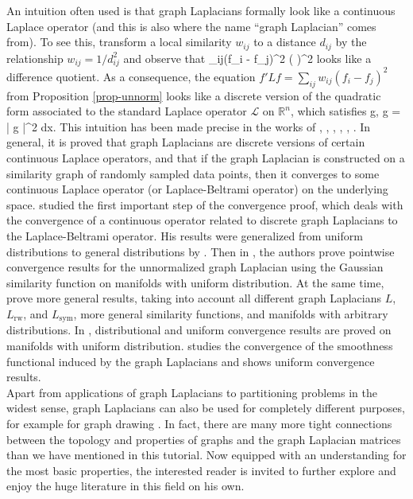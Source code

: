 \documentclass{article}
\def\ba#1\ea{\begin{align*}#1\end{align*}} %
\newcommand{\RR}{\mathbb{R}}
\newcommand{\R}{\RR}
\newcommand{\Lcal}{\mathcal{L}}
\newcommand{\Lsym}{L_{\text{sym}}}
\newcommand{\Lrw}{L_{\text{rw}}}
\begin{document}
An intuition often used is that graph Laplacians formally look like a
continuous Laplace operator (and this is also where the name ``graph
Laplacian'' comes from). To see this, transform a local similarity
$w_{ij}$ to a distance $d_{ij}$ by the relationship $w_{ij} = 1 /
d_{ij}^2$ and observe that \ba w_{ij}(f_i - f_j)^2 \approx \left(
   \right)^2 \ea
%
looks like a difference quotient. As a consequence, the equation $f'Lf
= \sum_{ij} w_{ij} (f_i - f_j)^2$ from Proposition \ref{prop-unnorm}
looks like a discrete version of the quadratic form associated to the
standard Laplace operator $\Lcal$ on $\R^n$, which satisfies \ba
\langle g, \Lcal g \rangle = \int | \nabla g |^2 dx.  \ea
%
This intuition has been made precise in the works of , ,
, , ,
.
%
In general, it is proved that graph Laplacians are
discrete versions of certain continuous Laplace operators, and that if
the graph Laplacian is constructed on a similarity graph of randomly
sampled data points, then it converges to some continuous Laplace
operator (or Laplace-Beltrami operator) on the underlying space.
%
 studied the first important step of the convergence
proof, which deals with the convergence of a continuous operator
related to discrete graph Laplacians to the Laplace-Beltrami
operator. %
His results were generalized from uniform distributions to general
distributions by . Then in , the
authors prove pointwise convergence results for the unnormalized graph
Laplacian using the Gaussian similarity function on manifolds with
uniform distribution. At the same time,  prove more
general results, taking into account all different graph Laplacians
$L$, $\Lrw$, and $\Lsym$, more general similarity functions, and
manifolds with arbitrary distributions. In ,
distributional and uniform convergence results are proved on manifolds
with uniform distribution.   studies the convergence of
the smoothness functional induced by the graph
Laplacians and shows uniform convergence results. \\









Apart from applications of graph Laplacians to partitioning problems
in the widest sense, graph Laplacians can also be used for completely
different purposes, for example for graph drawing \cite{Koren05}. In
fact, there are many more tight connections between the topology and
properties of graphs and the graph Laplacian matrices than we have
mentioned in this tutorial. Now equipped with an understanding for the
most basic properties, the interested reader is invited to further
explore and enjoy the huge literature in this field on his own.





%

%



%
\end{document}
